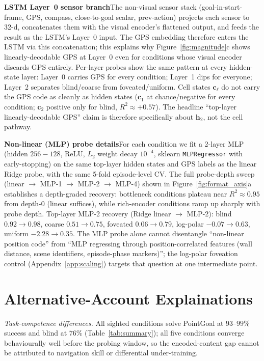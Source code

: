 \documentclass{article}
\begin{document}
\noindent\textbf{LSTM Layer~0 sensor branch}\quad The non-visual sensor stack (goal-in-start-frame, GPS, compass, close-to-goal scalar, prev-action) projects each sensor to 32-d, concatenates them with the visual encoder's flattened output, and feeds the result as the LSTM's Layer~0 input. The GPS embedding therefore enters the LSTM via this concatenation; this explains why Figure~\ref{fig:magnitude}c shows linearly-decodable GPS at Layer~0 even for conditions whose visual encoder discards GPS entirely. Per-layer probes show the same pattern at every hidden-state layer: Layer~0 carries GPS for every condition; Layer~1 dips for everyone; Layer~2 separates blind/coarse from foveated/uniform. Cell states $\mathbf{c}_\ell$ do not carry the GPS code as cleanly as hidden states ($\mathbf{c}_1$ at chance/negative for every condition; $\mathbf{c}_2$ positive only for blind, $R^2 \approx +0.57$). The headline ``top-layer linearly-decodable GPS'' claim is therefore specifically about $\mathbf{h}_2$, not the cell pathway.

\noindent\textbf{Non-linear (MLP) probe details}\quad For each condition we fit a 2-layer MLP (hidden $256{-}128$, ReLU, $L_2$ weight decay $10^{-4}$, sklearn \texttt{MLPRegressor} with early-stopping) on the same top-layer hidden states and GPS labels as the linear Ridge probe, with the same 5-fold episode-level CV. The full probe-depth sweep (linear $\to$ MLP-1 $\to$ MLP-2 $\to$ MLP-4) shown in Figure~\ref{fig:format_axis}a establishes a depth-graded recovery: bottleneck conditions plateau near $R^2 \approx 0.95$ from depth-0 (linear suffices), while rich-encoder conditions ramp up sharply with probe depth. Top-layer MLP-2 recovery (Ridge linear $\to$ MLP-2): blind $0.92 \to 0.98$, coarse $0.51 \to 0.75$, foveated $0.06 \to 0.79$, log-polar $-0.07 \to 0.63$, uniform $-2.28 \to 0.35$. The MLP probe alone cannot disentangle ``non-linear position code'' from ``MLP regressing through position-correlated features (wall distance, scene identifiers, episode-phase markers)''; the log-polar foveation control (Appendix~\ref{app:scaling}) targets that question at one intermediate point.

\section{Alternative-Account Explainations}
\label{app:alt-accounts}

\emph{Task-competence differences.} All sighted conditions solve PointGoal at $93$--$99\%$ success and blind at $76\%$ (Table~\ref{tab:summary}); all five conditions converge behaviourally well before the probing window, so the encoded-content gap cannot be attributed to navigation skill or differential under-training.
\end{document}
